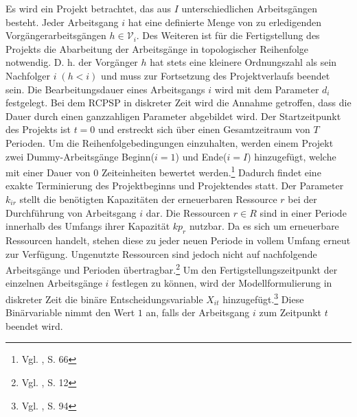 \documentclass[a4paper,12pt,parskip,bibtotoc,liststotoc]{article}
\begin{document}
Es wird ein Projekt betrachtet, das aus $I$ unterschiedlichen Arbeitsgängen besteht. Jeder Arbeitsgang $i$ hat eine definierte Menge von zu erledigenden Vorgängerarbeitsgängen $h \in \mathcal{V}_{i}$. Des Weiteren ist für die Fertigstellung des Projekts die Abarbeitung der Arbeitsgänge in topologischer Reihenfolge notwendig. D. h. der Vorgänger $h$ hat stets eine kleinere Ordnungszahl als sein Nachfolger $i\;(h<i)$ und muss zur Fortsetzung des Projektverlaufs beendet sein. Die Bearbeitungsdauer eines Arbeitsgangs $i$ wird mit dem Parameter $d_{i}$ festgelegt.  Bei dem RCPSP in diskreter Zeit wird die Annahme getroffen, dass die Dauer durch einen ganzzahligen Parameter abgebildet wird. Der Startzeitpunkt des Projekts ist $t = 0$ und erstreckt sich über einen Gesamtzeitraum von $T$ Perioden. Um die Reihenfolgebedingungen einzuhalten, werden einem Projekt zwei Dummy-Arbeitsgänge \glqq Beginn\grqq\;($i=1$) und \glqq Ende\grqq\;($i=I$) hinzugefügt, welche mit einer Dauer von $0$ Zeiteinheiten bewertet werden.\footnote{Vgl. \cite{zimmermann2006projektplanung}, S. 66} Dadurch findet eine exakte Terminierung des Projektbeginns und Projektendes statt. Der Parameter $k_{ir}$ stellt die benötigten Kapazitäten der erneuerbaren Ressource $r$ bei der Durchführung von Arbeitsgang $i$ dar. Die Ressourcen $r \in R$ sind in einer Periode innerhalb des Umfangs ihrer Kapazität $kp_{r}$ nutzbar. Da es sich um erneuerbare Ressourcen handelt, stehen diese zu jeder neuen Periode in vollem Umfang erneut zur Verfügung. Ungenutzte Ressourcen sind jedoch nicht auf nachfolgende Arbeitsgänge und Perioden übertragbar.\footnote{Vgl. \cite{kellenbrink2014einfuhrung}, S. 12} Um den Fertigstellungszeitpunkt der einzelnen Arbeitsgänge $i$ festlegen zu können, wird der Modellformulierung in diskreter Zeit die binäre Entscheidungsvariable $X_{it}$ hinzugefügt.\footnote{Vgl. \cite{pritsker1969multiproject}, S. 94} Diese Binärvariable nimmt den Wert $1$ an, falls der Arbeitsgang $i$ zum Zeitpunkt $t$ beendet wird.\\
\end{document}
